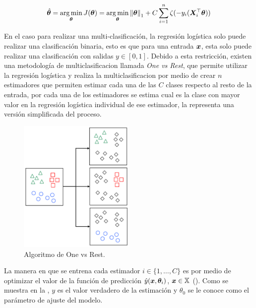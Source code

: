 \begin{equation} \label{eq:ovr-reg-l1costfunc}
  \hat{{\bm{\theta}}} = \operatorname*{arg\,min}_{{\bm{\theta}}} J({\bm{\theta}}) = \operatorname*{arg\,min}_{{\bm{\theta}}} \left\lVert{\bm{\theta}}\right\rVert_1 + C \sum_{i=1}^n \zeta(- y_i ({\bm{X}}_i^{\top} {\bm{\theta}}))
\end{equation}

En el caso para realizar una multi-clasificación, la regresión logística solo puede realizar una clasificación binaria, esto es que para una entrada ${\bm{x}}$, esta solo puede realizar una clasificación con salidas $y \in [0, 1]$. Debido a esta restricción, existen una metodología de multiclasificacion llamada \emph{One vs Rest}, que permite utilizar la regresión logística y realiza la multiclasificacion por medio de crear $n$ estimadores que permiten estimar cada una de las $C$ clases respecto al resto de la entrada, por cada una de los estimadores se estima cual es la clase con mayor valor en la regresión logística individual de ese estimador, la  representa una versión simplificada del proceso.

\begin{figure}[H]
  \centering
  \includegraphics[width=0.5\textwidth]{Figures/one-vs-rest.pdf}
\decoRule
\caption[Algoritmo de One vs Rest]{Algoritmo de One vs Rest.}
\label{fig:ovr-algo}
\end{figure}

La manera en que se entrena cada estimador $i \in \{1, \ldots, C\}$ es por medio de optimizar el valor de la función de predicción $\hat{y}({\bm{x}}, {\bm{\theta}}_i)$, ${\bm{x}} \in {\mathbb{X}}$ (). Como se muestra en la , $y$ es el valor verdadero de la estimación y $\theta_0$ se le conoce como el parámetro de ajuste del modelo.

